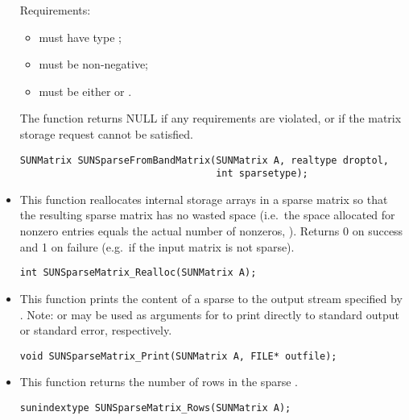 \begin{itemize}
  Requirements:
  \begin{itemize}
  \item {} must have type ;
  \item {} must be non-negative;
  \item {} must be either  or .
  \end{itemize}
  The function returns NULL if any requirements are violated, or if
  the matrix storage request cannot be satisfied. 

  \begin{verbatim}
SUNMatrix SUNSparseFromBandMatrix(SUNMatrix A, realtype droptol,
                                  int sparsetype);
  \end{verbatim}


\item {}

  This function reallocates internal storage arrays in a sparse matrix
  so that the resulting sparse matrix has no wasted space (i.e.~the
  space allocated for nonzero entries equals the actual number of
  nonzeros, ). Returns 0 on success and 
  1 on failure (e.g.~if the input matrix is not sparse).

  \verb|int SUNSparseMatrix_Realloc(SUNMatrix A);|


\item {}

  This function prints the content of a sparse  to the
  output stream specified by .  Note: 
  or  may be used as arguments for  to print
  directly to standard output or standard error, respectively.
 
  \verb|void SUNSparseMatrix_Print(SUNMatrix A, FILE* outfile);|


\item {}

  This function returns the number of rows in the sparse .
 
  \verb|sunindextype SUNSparseMatrix_Rows(SUNMatrix A);|



\end{itemize}
